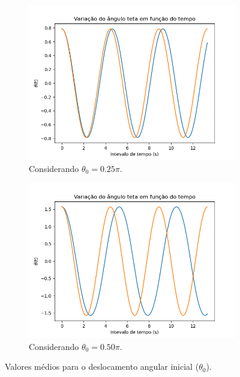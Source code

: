 \documentclass[12pt,openright,twoside,english,brazil]{abntex2}
\begin{document}
\begin{figure}[h]
 \centering
 \begin{subfigure}{.5\textwidth}
  \centering
  \includegraphics[width=1.1\linewidth]{teta-0-25pi.png}
  \caption{Considerando $\theta_0=0.25\pi$.}
 \end{subfigure}%
 \begin{subfigure}{.5\textwidth}
  \centering
  \includegraphics[width=1.1\linewidth]{teta-0-50pi.png}
  \caption{Considerando $\theta_0=0.50\pi$.}
 \end{subfigure}
 \caption{Valores médios para o deslocamento angular inicial ($\theta_0$).}
 \label{Figura6}
\end{figure}
\end{document}
